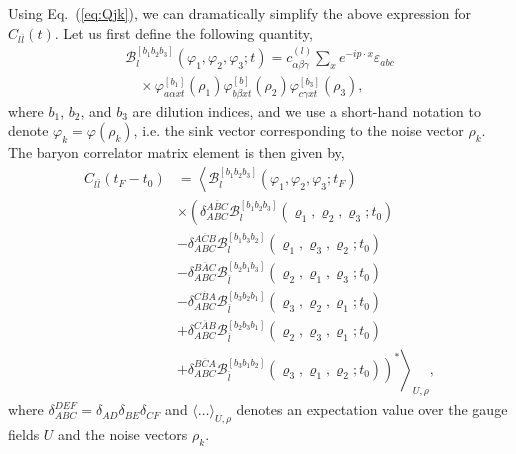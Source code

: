 Using Eq.~(\ref{eq:Qjk}), we can dramatically simplify the above expression for $C_{l\overline l}(t)$. Let us first define the following quantity,
\begin{equation}\label{eq:baryon_func}
    \begin{array}{l}
        \mathcal{B}_{l}^{\left[b_{1} b_{2} b_{3}\right]}\left(\varphi_{1}, \varphi_{2}, \varphi_{3} ; t\right)=c_{\alpha \beta \gamma}^{(l)} \sum_{x} e^{-i p \cdot x} \varepsilon_{a b c} \\
        \quad \times \varphi_{a \alpha x t}^{\left[b_{1}\right]}\left(\rho_{1}\right) \varphi_{b \beta x t}^{[b]}\left(\rho_{2}\right) \varphi_{c \gamma x t}^{\left[b_{3}\right]}\left(\rho_{3}\right),
        \end{array}
\end{equation}
where $b_1$, $b_2$, and $b_3$ are dilution indices, and we use a short-hand notation to denote $\varphi_k = \varphi(\rho_k)$, i.e. the sink vector corresponding to the noise vector $\rho_k$. The baryon correlator matrix element is then given by,
\begin{equation}\label{eq:corr_fac}
    \begin{aligned}
        C_{l \overline{l}}\left(t_{F}-t_{0}\right) &=\left\langle\mathcal{B}_{l}^{\left[b_{1} b_{2} b_{3}\right]}\left(\varphi_{1}, \varphi_{2}, \varphi_{3} ; t_{F}\right)\right.\\
        & \times\left(\delta_{A B C}^{\overline{A B C}} \mathcal{B}_{l}^{\left[b_{1} b_{2} b_{3}\right]}\left(\varrho_{1}, \varrho_{2}, \varrho_{3} ; t_{0}\right)\right.\\
        &-\delta_{A B C}^{\overline{A C B}} \mathcal{B}_{l}^{\left[b_{1} b_{3} b_{2}\right]}\left(\varrho_{1}, \varrho_{3}, \varrho_{2} ; t_{0}\right) \\
        &-\delta_{A B C}^{\overline{B A C}} \mathcal{B}_{\overline{l}}^{\left[b_{2} b_{1} b_{3}\right]}\left(\varrho_{2}, \varrho_{1}, \varrho_{3} ; t_{0}\right) \\
        &-\delta_{A B C}^{\overline{C B A}} \mathcal{B}_{\overline{l}}^{\left[b_{3} b_{2} b_{1}\right]}\left(\varrho_{3}, \varrho_{2}, \varrho_{1} ; t_{0}\right) \\
        &+\delta_{A B C}^{\overline{C A B}} \mathcal{B}_{\overline{l}}^{\left[b_{2} b_{3} b_{1}\right]}\left(\varrho_{2}, \varrho_{3}, \varrho_{1} ; t_{0}\right) \\
        &\left.\left.+\delta_{A B C}^{\overline{B C A}} \mathcal{B}_{\overline{l}}^{\left[b_{3} b_{1} b_{2}\right]}\left(\varrho_{3}, \varrho_{1}, \varrho_{2} ; t_{0}\right)\right)^{*}\right\rangle_{U, \rho},
    \end{aligned}
\end{equation}
where $\delta_{A B C}^{D E F}=\delta_{A D} \delta_{B E} \delta_{C F}$ and $\langle\ldots\rangle_{U, \rho}$ denotes an expectation value over the gauge fields $U$ and the noise vectors $\rho_k$.

